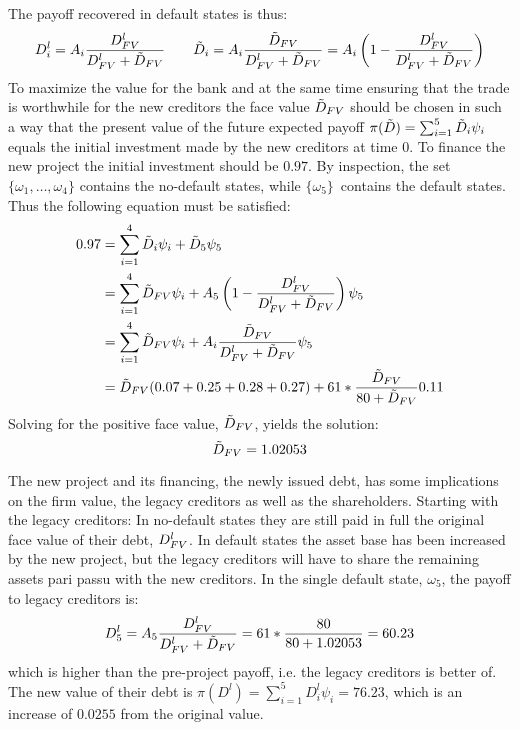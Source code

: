 \documentclass[10pt,a4paper]{article}
\begin{document}
        The payoff recovered in default states is thus:
            \begin{equation}
                D_{i}^{l} = A_{i} \frac{D_{FV}^{l}}{D_{FV}^{l} + \tilde{D}_{FV}} 
                \qquad 
                \tilde{D}_{i} = A_{i} \frac{\tilde{D}_{FV}}{D_{FV}^{l} + \tilde{D}_{FV}} 
                = A_{i} \left(1 - \frac{D_{FV}^{l}}{D_{FV}^{l} + \tilde{D}_{FV}} \right)
            \end{equation}
        To maximize the value for the bank and at the same time ensuring that the trade is worthwhile for the new creditors the face value $\tilde{D}_{FV}$ should be chosen in such a way that the present value of the future expected payoff $\pi(\tilde{D}) = \sum_{i=1}^{5} \tilde{D}_{i} \psi_{i}$ equals the initial investment made by the new creditors at time 0. To finance the new project the initial investment should be $0.97$. By inspection, the set $\{\omega_{1}, \dots, \omega_{4}\}$ contains the no-default states, while $\{\omega_{5}\}$ contains the default states. Thus the following equation must be satisfied:
            \begin{align}
                0.97 &= \sum_{i=1}^{4} \tilde{D}_{i} \psi_{i} + \tilde{D}_{5}\psi_{5} \\
                &= \sum_{i=1}^{4} \tilde{D}_{FV} \psi_{i} + A_{5} \left(1 - \frac{D_{FV}^{l}}{D_{FV}^{l} + \tilde{D}_{FV}} \right)\psi_{5} \\ 
                &= \sum_{i=1}^{4} \tilde{D}_{FV} \psi_{i} + A_{i} \frac{\tilde{D}_{FV}}{D_{FV}^{l} + \tilde{D}_{FV}} \psi_{5} \\ 
                &= \tilde{D}_{FV} (0.07+0.25+0.28+0.27) + 61 * \frac{\tilde{D}_{FV}}{80 + \tilde{D}_{FV}} 0.11
            \end{align}
        Solving for the positive face value, $\tilde{D}_{FV}$, yields the solution:
            \begin{equation}
                \tilde{D}_{FV} = 1.02053
            \end{equation}

        The new project and its financing, the newly issued debt, has some implications on the firm value, the legacy creditors as well as the shareholders. Starting with the legacy creditors: In no-default states they are still paid in full the original face value of their debt, $D_{FV}^{l}$. In default states the asset base has been increased by the new project, but the legacy creditors will have to share the remaining assets pari passu with the new creditors. In the single default state, $\omega_{5}$, the payoff to legacy creditors is:
            \begin{equation}
                D_{5}^{l} = A_{5} \frac{D_{FV}^{l}}{D_{FV}^{l} + \tilde{D}_{FV}} = 61 * \frac{80}{80 + 1.02053} = 60.23
            \end{equation}
        which is higher than the pre-project payoff, i.e. the legacy creditors is better of. The new value of their debt is $\pi(D^{l}) = \sum_{i=1}^{5} D_{i}^{l} \psi_{i} = 76.23$, which is an increase of $0.0255$ from the original value.
\end{document}

